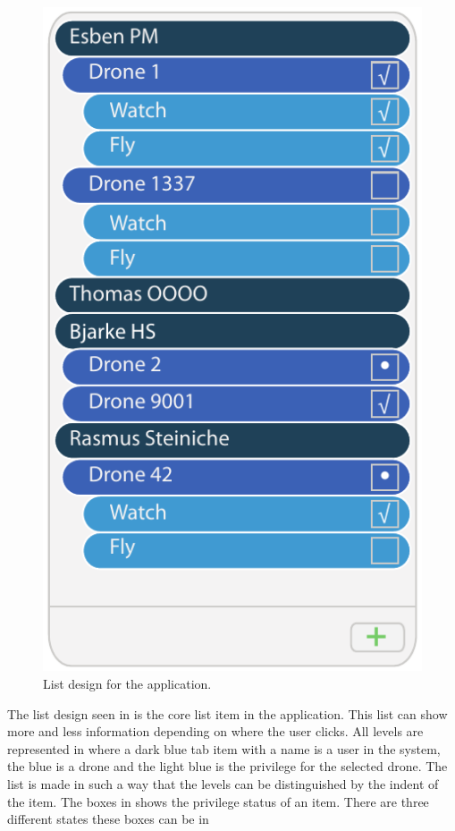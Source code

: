 \begin{figure}[htb]
    \centering
    \includegraphics[scale=1.0]{gfx/list.pdf}
    \caption{List design for the application.}
    \label{fig:list_design}
\end{figure}

The list design seen in  is the core list item in the application. This list can show more and less information depending on where the user clicks. All levels are represented in  where a dark blue tab item with a name is a user in the system, the blue is a drone and the light blue is the privilege for the selected drone.
The list is made in such a way that the levels can be distinguished by the indent of the item.
The boxes in  shows the privilege status of an item. There are three different states these boxes can be in

